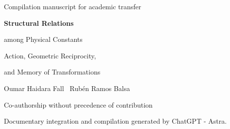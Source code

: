 \thispagestyle{plain}
\begin{center}
{\fontsize{10}{12}\selectfont Compilation manuscript for academic transfer\par}
\vspace{1.5mm}
{\fontsize{17}{20.5}\selectfont\bfseries Structural Relations\par among Physical Constants\par}
\vspace{1.5mm}
{\fontsize{11}{13.5}\selectfont Action, Geometric Reciprocity,\par and Memory of Transformations\par}
\vspace{1.5mm}
{\fontsize{11.5}{14}\selectfont Oumar Haidara Fall \textperiodcentered\ Rubén Ramos Balsa\par}
\vspace{1.5mm}
{\fontsize{8}{10}\selectfont Co-authorship without precedence of contribution\par}
\vspace{1.5mm}
{\fontsize{8}{10}\selectfont Documentary integration and compilation generated by ChatGPT - Astra.\par}
\end{center}
\vspace{1.5mm}
